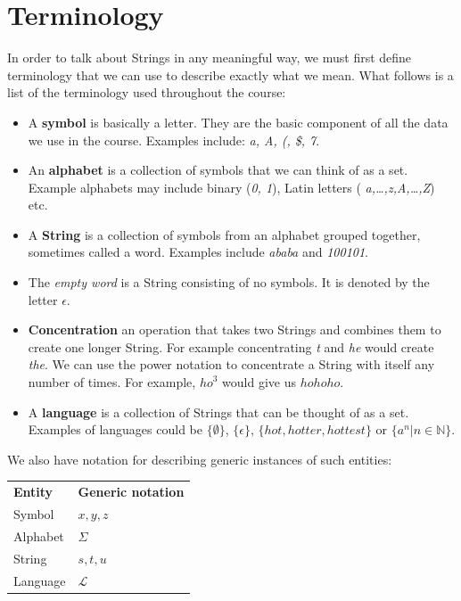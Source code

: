 
\section{Terminology}

In order to talk about Strings in any meaningful way, we must first define
terminology that we can use to describe exactly what we mean. What follows is a
list of the terminology used throughout the course:

\begin{itemize}
  \item A {\bf symbol} is basically a letter. They are the basic component of
  all the data we use in the course. Examples include: {\it a, A, (, \$, 7}.
  \item An {\bf alphabet} is a collection of symbols that we can think of as a
  set. Example alphabets may include binary ({\it 0, 1}), Latin letters ({\it
  a,\dots,z,A,\dots,Z}) etc.
  \item A {\bf String} is a collection of symbols from an alphabet grouped
  together, sometimes called a word. Examples include {\it ababa} and
  {\it 100101}.
  \item The {\it empty word} is a String consisting of no symbols. It is
  denoted by the letter $\epsilon$.
  \item {\bf Concentration} an operation that takes two Strings and combines
  them to create one longer String. For example concentrating {\it t} and {\it
  he} would create {\it the}. We can use the power notation to concentrate a
  String with itself any number of times. For example, ${ho}^3$ would give us
  $hohoho$.
  \item A {\bf language} is a collection of Strings that can be thought of as
  a set. Examples of languages could be $\{\emptyset\}$, $\{\epsilon\}$,
  $\{hot,hotter,hottest\}$ or $\{a^n | n \in \mathbb{N}\}$.
\end{itemize}

We also have notation for describing generic instances of such entities:

\begin{center}
  \begin{tabular}{l l}
    {\bf Entity} & {\bf Generic notation}\\
    Symbol & $x, y, z$\\
    Alphabet & $\Sigma$\\
    String & $s, t, u$\\
    Language & $\mathcal{L}$\\
  \end{tabular}
\end{center}

